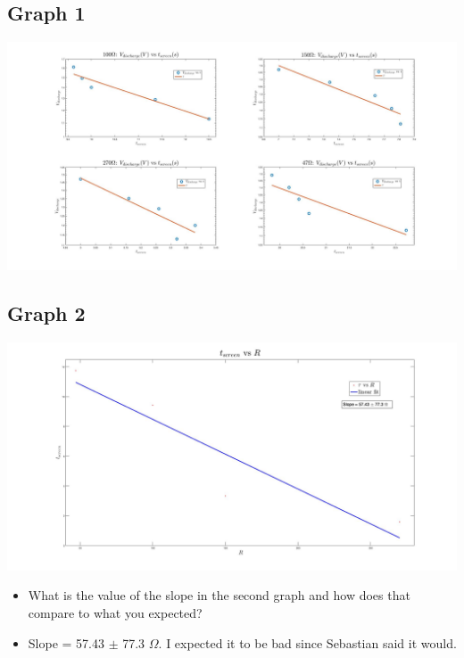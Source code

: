 \documentclass{article}
\begin{document}
\begin{center}
  \subsection*{Graph 1}
  \includegraphics[width=\textwidth]{graph1.jpg}
  \subsection*{Graph 2}
  \includegraphics[width=\textwidth]{graph2.jpg}
\end{center}
\begin{itemize}
  \item What is the value of the slope in the second graph and how does that compare to what you expected?
  \item[] Slope = 57.43 \(\pm \) 77.3 \(\Omega \). I expected it to be bad since Sebastian said it would.
\end{itemize}
\end{document}
